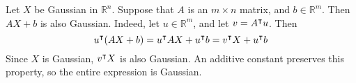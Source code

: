 Let \(X\) be Gaussian in \(\mathbb R^n\). Suppose that \(A\) is an \(m \times n\) matrix, and \(b \in \mathbb R^m\). Then \(AX + b\) is also Gaussian. Indeed, let \(u \in \mathbb R^m\), and let \(v = A^\intercal u\). Then
\[ u^\intercal(AX + b) = u^\intercal AX + u^\intercal b = v^\intercal X + u^\intercal b \]
Since \(X\) is Gaussian, \(v^\intercal X\) is also Gaussian. An additive constant preserves this property, so the entire expression is Gaussian.
